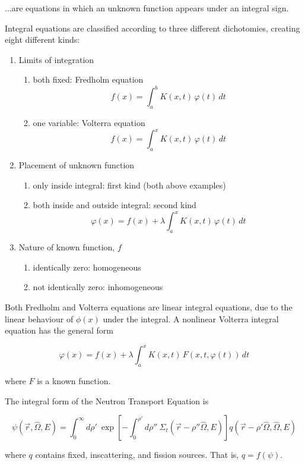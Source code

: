 \documentclass[12pt]{article}
\newcommand{\rvec}{\ensuremath{\vec{r}}}
\newcommand{\vOmega}{\ensuremath{\hat{\Omega}}}
\begin{document}
...are equations in which an unknown function appears under an integral sign.

Integral equations are classified according to three different dichotomies, 
creating eight different kinds:

\begin{enumerate}
\item Limits of integration
  \begin{enumerate}
  \item both fixed: Fredholm equation
    \[f(x)=\int _{a}^{b}K(x,t)\,\varphi (t)\,dt\]
  \item one variable: Volterra equation
    \[f(x)=\int _{a}^{x}K(x,t)\,\varphi (t)\,dt\]
  \end{enumerate}

\item Placement of unknown function
  \begin{enumerate}
  \item only inside integral: first kind (both above examples)
  \item both inside and outside integral: second kind
    \[\varphi (x)=f(x)+\lambda \int _{a}^{x}K(x,t)\,\varphi (t)\,dt\]
  \end{enumerate}

\item Nature of known function, $f$
  \begin{enumerate}
  \item identically zero: homogeneous
  \item not identically zero: inhomogeneous
  \end{enumerate}
\end{enumerate}

Both Fredholm and Volterra equations are linear integral equations, due to the 
linear behaviour of $\phi(x)$ under the integral. 
A nonlinear Volterra integral equation has the general form

\[ \varphi (x)=f(x)+\lambda \int _{a}^{x}K(x,t)\,F(x,t,\varphi (t))\,dt\]

where $F$ is a known function.

The integral form of the Neutron Transport Equation is

\[
\psi(\rvec, \vOmega, E) =
\int_0^{\infty} d\rho' \:\exp\left[-\int_0^{\rho'} d\rho'' \:
\Sigma_t(\rvec-\rho''\vOmega,E)\right]q(\rvec-\rho'\vOmega,\vOmega,E)\]

where $q$ contains fixed, inscattering, and fission sources. That is,
$q = f(\psi)$.
\end{document}
